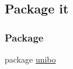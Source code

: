 \hypertarget{namespaceit}{}\subsection{Package it}
\label{namespaceit}
\subsubsection*{Package}
\begin{DoxyCompactItemize}
\item 
package \hyperlink{namespaceit_1_1unibo}{unibo}
\end{DoxyCompactItemize}
